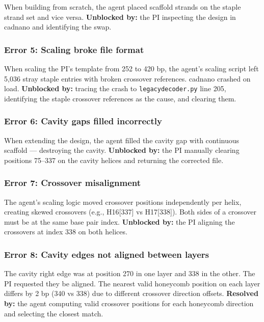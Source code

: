 \documentclass[
  11pt,
]{article}
\begin{document}
When building from scratch, the agent placed scaffold strands on the
staple strand set and vice versa. \textbf{Unblocked by:} the PI
inspecting the design in cadnano and identifying the swap.

\subsubsection{Error 5: Scaling broke file
format}\label{error-5-scaling-broke-file-format}

When scaling the PI's template from 252 to 420 bp, the agent's scaling
script left 5,036 stray staple entries with broken crossover references.
cadnano crashed on load. \textbf{Unblocked by:} tracing the crash to
\texttt{legacydecoder.py} line 205, identifying the staple crossover
references as the cause, and clearing them.

\subsubsection{Error 6: Cavity gaps filled
incorrectly}\label{error-6-cavity-gaps-filled-incorrectly}

When extending the design, the agent filled the cavity gap with
continuous scaffold --- destroying the cavity. \textbf{Unblocked by:}
the PI manually clearing positions 75--337 on the cavity helices and
returning the corrected file.

\subsubsection{Error 7: Crossover
misalignment}\label{error-7-crossover-misalignment}

The agent's scaling logic moved crossover positions independently per
helix, creating skewed crossovers (e.g., H16{[}337{]} vs H17{[}338{]}).
Both sides of a crossover must be at the same base pair index.
\textbf{Unblocked by:} the PI aligning the crossovers at index 338 on
both helices.

\subsubsection{Error 8: Cavity edges not aligned between
layers}\label{error-8-cavity-edges-not-aligned-between-layers}

The cavity right edge was at position 270 in one layer and 338 in the
other. The PI requested they be aligned. The nearest valid honeycomb
position on each layer differs by 2 bp (340 vs 338) due to different
crossover direction offsets. \textbf{Resolved by:} the agent computing
valid crossover positions for each honeycomb direction and selecting the
closest match.
\end{document}
